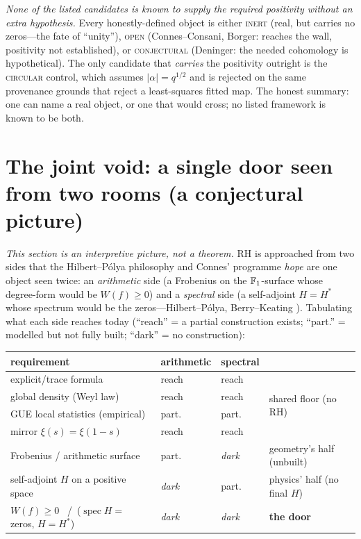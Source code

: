 \documentclass[11pt]{article}
\begin{document}
\noindent \emph{None of the listed candidates is known to supply the required
positivity without an extra hypothesis.} Every honestly-defined object is either
\textsc{inert} (real, but carries no zeros---the fate of ``unity''), \textsc{open}
(Connes--Consani, Borger: reaches the wall, positivity not established), or
\textsc{conjectural} (Deninger: the needed cohomology is hypothetical). The only
candidate that \emph{carries} the positivity outright is the \textsc{circular} control,
which assumes $|\alpha|=q^{1/2}$ and is rejected on the same provenance grounds that
reject a least-squares fitted map. The honest summary: one can name a real object, or
one that would cross; no listed framework is known to be both.

\section{The joint void: a single door seen from two rooms (a conjectural picture)}
\emph{This section is an interpretive picture, not a theorem.} RH is approached from two
sides that the Hilbert--P\'olya philosophy and Connes' programme \emph{hope} are one
object seen twice: an \emph{arithmetic} side (a Frobenius on the $\mathbb{F}_1$-surface whose
degree-form would be $W(f)\ge 0$) and a \emph{spectral} side (a self-adjoint $H=H^*$
whose spectrum would be the zeros---Hilbert--P\'olya, Berry--Keating \cite{BerryKeating}).
Tabulating what each side reaches today (``reach'' = a partial construction exists;
``part.'' = modelled but not fully built; ``dark'' = no construction):

\begin{center}\small
\begin{tabular}{llll}
\hline
requirement & arithmetic & spectral & \\
\hline
explicit/trace formula & reach & reach & \multirow{4}{*}{\small shared floor (no RH)}\\
global density (Weyl law) & reach & reach & \\
GUE local statistics (empirical) & part. & part. & \\
mirror $\xi(s)=\xi(1-s)$ & reach & reach & \\
\hline
Frobenius / arithmetic surface & part. & \emph{dark} & geometry's half (unbuilt) \\
self-adjoint $H$ on a positive space & \emph{dark} & part. & physics' half (no final $H$) \\
\hline
$W(f)\ge0$ \ /\ ($\operatorname{spec} H=$ zeros, $H=H^*$) & \emph{dark} & \emph{dark} & \textbf{the door} \\
\hline
\end{tabular}
\end{center}
\end{document}
